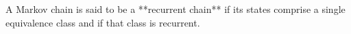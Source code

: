A Markov chain is said to be a **recurrent chain** if its states comprise a single equivalence class and if that class is recurrent.
